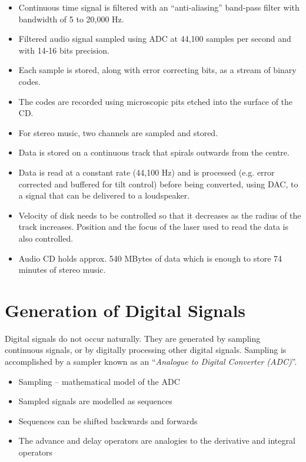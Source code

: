 \begin{slide}\label{slide:CD1}
\begin{itemize}
\item Continuous time signal is filtered with an ``anti-aliasing''
  band-pass filter with bandwidth of 5 to 20,000 Hz.
\item Filtered audio signal sampled using ADC at 44,100 samples per second and
  with 14-16 bits precision. 
\item Each sample is stored, along with error
  correcting bits, as a stream of binary codes. 
\item The codes are recorded using microscopic pits etched into the surface of the CD.
\end{itemize}
\end{slide}

\begin{slide}\label{slide:CD2}
\begin{itemize}
\item For stereo music, two channels are sampled and stored.
\item Data is stored on a continuous track that spirals outwards from
  the centre.
\item Data is read at a constant rate (44,100 Hz) and is processed (e.g.
  error corrected and buffered for tilt control) before being
  converted, using DAC, to a signal that can be delivered to a
  loudspeaker.
\item Velocity of disk needs to be controlled so that it decreases as
  the radius of the track increases. Position and the focus of the laser used to read the data is
  also controlled.
\item Audio CD holds approx. 540 MBytes of data which is enough to
  store 74 minutes of stereo music.
\end{itemize}
\end{slide}


\section*{Generation of Digital Signals}
Digital signals do not occur naturally. They are generated by
sampling continuous signals, or by digitally processing other
digital signals. Sampling is accomplished by a sampler known as an
``\emph{Analogue to Digital Converter (ADC)}''.

\begin{slide}\label{slide:l7s2a}
  \begin{itemize}
   \item Sampling -- mathematical model of the ADC
   \item Sampled signals are modelled as sequences
   \item Sequences can be shifted backwards and forwards
   \item The advance and delay operators are analogies to the derivative
     and integral operators
  \end{itemize}
\end{slide}

